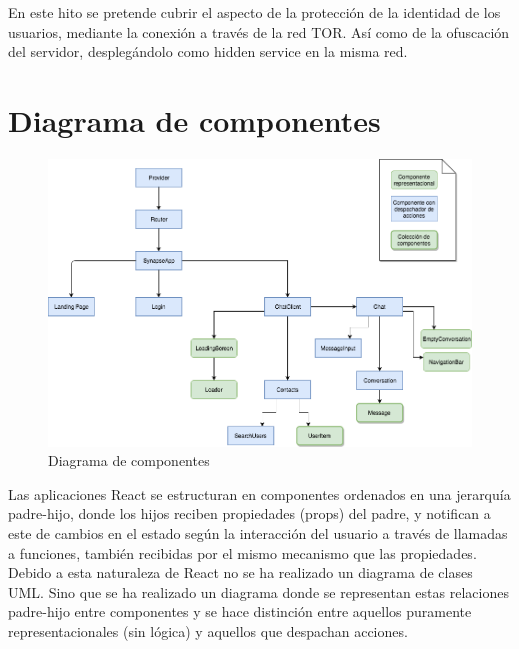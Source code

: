 En este hito se pretende cubrir el aspecto de la protección de la identidad de los usuarios, mediante la conexión a través de la red TOR. Así como de la ofuscación del servidor, desplegándolo como hidden service en la misma red. \\

\section{Diagrama de componentes}

\begin{figure}[H]
	\centering
	\includegraphics[width=\textwidth]{imagenes/diagrama-componentes}
	\caption{Diagrama de componentes}
	\label{fig:desktop-landing-page}
\end{figure}

Las aplicaciones React se estructuran en componentes ordenados en una jerarquía padre-hijo, donde los hijos reciben propiedades (props) del padre, y notifican a este de cambios en el estado según la interacción del usuario a través de llamadas a funciones, también recibidas por el mismo mecanismo que las propiedades.\\ 

Debido a esta naturaleza de React no se ha realizado un diagrama de clases UML. Sino que se ha realizado un diagrama donde se representan estas relaciones padre-hijo entre componentes y se hace distinción entre aquellos puramente representacionales (sin lógica) y aquellos que despachan acciones. \\ 